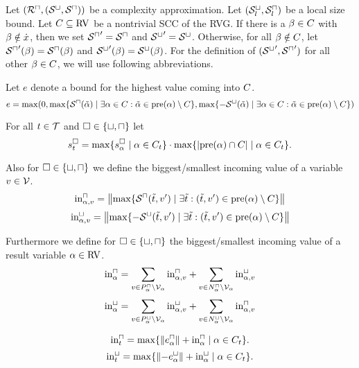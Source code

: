 \begin{theorem}
  Let $({\mathcal{R}^\sqcap}, {({\mathcal{S}^\sqcup}, {\mathcal{S}^\sqcap})})$ be a complexity approximation.
  Let ${({\mathcal{S}^\sqcup_l}, {\mathcal{S}^\sqcap_l})}$ be a local size bound.
  Let $C \subseteq \text{RV}$ be a nontrivial SCC of the RVG.
  If there is a $\beta \in C$ with $\beta \notin \dot{x}$, then we set ${\mathcal{S}^\sqcap}' = {\mathcal{S}^\sqcap}$ and ${\mathcal{S}^\sqcup}' = {\mathcal{S}^\sqcup}$.
  Otherwise, for all $\beta \notin C$, let ${\mathcal{S}^\sqcap}'(\beta) = {\mathcal{S}^\sqcap}(\beta)$ and ${\mathcal{S}^\sqcup}'(\beta) = {\mathcal{S}^\sqcup}(\beta)$.
  For the definition of $({\mathcal{S}^\sqcup}', {\mathcal{S}^\sqcap}')$ for all other $\beta \in C$, we will use following abbreviations.

  Let $e$ denote a bound for the highest value coming into $C$.
  \[ e = \max ( 0,
    \max \lbrace {\mathcal{S}^\sqcap}(\tilde{\alpha}) \mid \exists \alpha \in C: \tilde{\alpha} \in \text{pre}(\alpha) \setminus C \rbrace,
    \max \lbrace -{\mathcal{S}^\sqcup}(\tilde{\alpha}) \mid \exists \alpha \in C: \tilde{\alpha} \in \text{pre}(\alpha) \setminus C \rbrace)
  \]

  For all $t \in \mathcal{T}$ and $\square \in \lbrace \sqcup, \sqcap \rbrace$ let
  \[ s^\square_t = \max \lbrace s^\square_{\alpha} \mid \alpha \in C_t \rbrace \cdot \max \lbrace \left|\text{pre}(\alpha) \cap C\right| \mid \alpha \in C_t \rbrace. \]

  Also for $\square \in \lbrace \sqcup, \sqcap \rbrace$ we define the biggest/smallest incoming value of a variable $v \in \mathcal{V}$.
  \[ \text{in}^\sqcap_{\alpha,v} = \left\Vert\max \lbrace \mathcal{S}^\sqcap(\tilde{t}, v') \mid \exists \tilde{t}: (\tilde{t}, v') \in \text{pre}(\alpha) \setminus C \rbrace\right\Vert \]
  \[ \text{in}^\sqcup_{\alpha,v} = \left\Vert\max \lbrace -\mathcal{S}^\sqcup(\tilde{t}, v') \mid \exists \tilde{t}: (\tilde{t}, v') \in \text{pre}(\alpha) \setminus C \rbrace\right\Vert \]

  Furthermore we define for $\square \in \lbrace \sqcup, \sqcap \rbrace$ the biggest/smallest incoming value of a result variable $\alpha \in \text{RV}$.
  \[ \text{in}^\sqcap_\alpha = \sum_{v \in P_\alpha^\sqcap \setminus \mathcal{V}_\alpha} \text{in}^\sqcap_{\alpha,v} + \sum_{v \in N_\alpha^\sqcap \setminus \mathcal{V}_\alpha} \text{in}^\sqcup_{\alpha,v} \]
  \[ \text{in}^\sqcup_\alpha = \sum_{v \in P_\alpha^\sqcup \setminus \mathcal{V}_\alpha} \text{in}^\sqcup_{\alpha,v} + \sum_{v \in N_\alpha^\sqcup \setminus \mathcal{V}_\alpha} \text{in}^\sqcap_{\alpha,v} \]
  
  \[ \text{in}^\sqcap_t = \max \lbrace \left\Vert e^{\sqcap}_\alpha\right\Vert + \text{in}^\sqcap_\alpha \mid \alpha \in C_t  \rbrace. \]
  \[ \text{in}^\sqcup_t = \max \lbrace \left\Vert-e^{\sqcup}_\alpha\right\Vert + \text{in}^\sqcup_\alpha \mid \alpha \in C_t  \rbrace. \]


\end{theorem}
